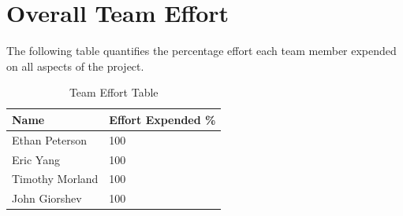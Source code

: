 \documentclass[letterpaper,11pt]{article}
\begin{document}
\section{Overall Team Effort}
The following table quantifies the percentage effort each team member expended
on all aspects of the project.


\begin{table}[H]
  \caption{Team Effort Table}
  \centering
  \begin{tabularx}{10cm}{l|l}
    \textbf{Name} & \textbf{Effort Expended \%}\\
    \hline
    Ethan Peterson & 100 \\
    \hline
    Eric Yang & 100 \\
    \hline
    Timothy Morland & 100 \\
    \hline
    John Giorshev & 100 \\
  \end{tabularx} 
\end{table}
\newpage




\newpage
{}
\newcommand{\changelocaltocdepth}[1]{%
  \addtocontents{toc}{\protect\setcounter{tocdepth}{#1}}%
  \setcounter{tocdepth}{#1}%
}
\changelocaltocdepth{1}

\pagestyle{empty}
\end{document}
